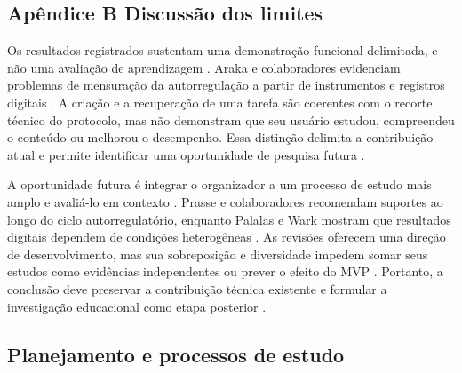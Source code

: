 \subsection*{Apêndice B Discussão dos limites}

Os resultados registrados sustentam uma demonstração funcional delimitada, e não uma avaliação de aprendizagem \citep[p. 4, 15–16]{education_araka2020}. Araka e colaboradores evidenciam problemas de mensuração da autorregulação a partir de instrumentos e registros digitais \citep[p. 4, 15–16]{education_araka2020}. A criação e a recuperação de uma tarefa são coerentes com o recorte técnico do protocolo, mas não demonstram que seu usuário estudou, compreendeu o conteúdo ou melhorou o desempenho. Essa distinção delimita a contribuição atual e permite identificar uma oportunidade de pesquisa futura \citep[p. 4, 15–16]{education_araka2020}.

A oportunidade futura é integrar o organizador a um processo de estudo mais amplo e avaliá-lo em contexto \citep[p. 1809, 1825–1827]{education_prasse2024} \citep[p. 156, 164–165]{education_palalas2020}. Prasse e colaboradores recomendam suportes ao longo do ciclo autorregulatório, enquanto Palalas e Wark mostram que resultados digitais dependem de condições heterogêneas \citep[p. 1809, 1825–1827]{education_prasse2024} \citep[p. 156, 164–165]{education_palalas2020}. As revisões oferecem uma direção de desenvolvimento, mas sua sobreposição e diversidade impedem somar seus estudos como evidências independentes ou prever o efeito do MVP \citep[p. 1809, 1825–1827]{education_prasse2024} \citep[p. 156, 164–165]{education_palalas2020}. Portanto, a conclusão deve preservar a contribuição técnica existente e formular a investigação educacional como etapa posterior \citep[p. 1809, 1825–1827]{education_prasse2024} \citep[p. 156, 164–165]{education_palalas2020}.

\clearpage\subsection*{Planejamento e processos de estudo}

